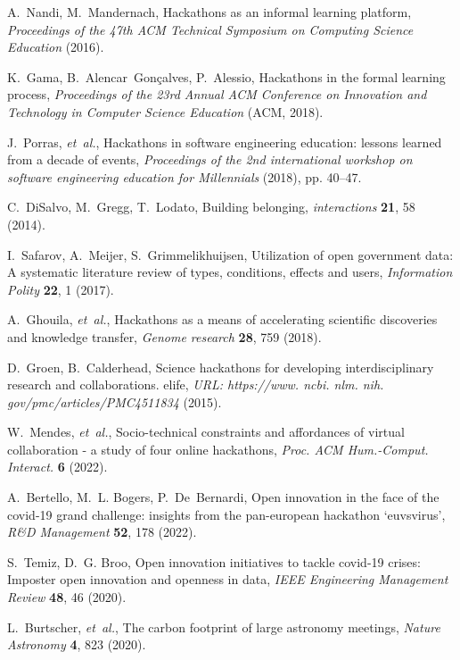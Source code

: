 \documentclass{ieeeaccess}
\begin{document}
\begin{thebibliography}{10}
A.~Nandi, M.~Mandernach, Hackathons as an informal learning platform, {\it
  Proceedings of the 47th ACM Technical Symposium on Computing Science
  Education\/} (2016).

K.~Gama, B.~Alencar~Gonçalves, P.~Alessio, Hackathons in the formal learning
  process, {\it Proceedings of the 23rd Annual ACM Conference on Innovation and
  Technology in Computer Science Education\/} (ACM, 2018).

J.~Porras, {\it et~al.\/}, Hackathons in software engineering education:
  lessons learned from a decade of events, {\it Proceedings of the 2nd
  international workshop on software engineering education for Millennials\/}
  (2018), pp. 40--47.

C.~DiSalvo, M.~Gregg, T.~Lodato, Building belonging, {\it interactions\/} {\bf
  21}, 58 (2014).

I.~Safarov, A.~Meijer, S.~Grimmelikhuijsen, Utilization of open government
  data: A systematic literature review of types, conditions, effects and users,
  {\it Information Polity\/} {\bf 22}, 1 (2017).

A.~Ghouila, {\it et~al.\/}, Hackathons as a means of accelerating scientific
  discoveries and knowledge transfer, {\it Genome research\/} {\bf 28}, 759
  (2018).

D.~Groen, B.~Calderhead, Science hackathons for developing interdisciplinary
  research and collaborations. elife, {\it URL: https://www. ncbi. nlm. nih.
  gov/pmc/articles/PMC4511834\/}  (2015).

W.~Mendes, {\it et~al.\/}, Socio-technical constraints and affordances of
  virtual collaboration - a study of four online hackathons, {\it Proc. ACM
  Hum.-Comput. Interact.\/} {\bf 6} (2022).

A.~Bertello, M.~L. Bogers, P.~De~Bernardi, Open innovation in the face of the
  covid-19 grand challenge: insights from the pan-european hackathon
  ‘euvsvirus’, {\it R\&D Management\/} {\bf 52}, 178 (2022).

S.~Temiz, D.~G. Broo, Open innovation initiatives to tackle covid-19 crises:
  Imposter open innovation and openness in data, {\it IEEE Engineering
  Management Review\/} {\bf 48}, 46 (2020).

L.~{Burtscher}, {\it et~al.\/}, {The carbon footprint of large astronomy
  meetings}, {\it Nature Astronomy\/} {\bf 4}, 823 (2020).


\end{thebibliography}
\end{document}
